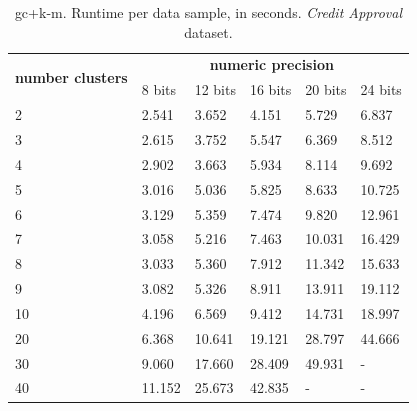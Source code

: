 \begin{table}[htp]
\centering
\caption{\acs{gc}+\acs{k-m}. Runtime per data sample, in seconds. \emph{Credit Approval} dataset.}
\label{table:runtimeKMCA}
\begin{tabular}{|l|l|l|l|l|l|}
\hline
\multirow{2}{*}{\textbf{number clusters}} & \multicolumn{5}{c|}{\textbf{numeric precision}}                                              \\ \cline{2-6}
                                          & 8 bits & 12 bits & 16 bits & 20 bits & 24 bits \\ \hline
2                                & 2.541           & 3.652            & 4.151            & 5.729            & 6.837            \\ \hline
3                                & 2.615           & 3.752            & 5.547            & 6.369            & 8.512            \\ \hline
4                                & 2.902           & 3.663            & 5.934            & 8.114            & 9.692            \\ \hline
5                                & 3.016           & 5.036            & 5.825            & 8.633            & 10.725           \\ \hline
6                                & 3.129           & 5.359            & 7.474            & 9.820            & 12.961           \\ \hline
7                                & 3.058           & 5.216            & 7.463            & 10.031           & 16.429           \\ \hline
8                                & 3.033           & 5.360            & 7.912            & 11.342           & 15.633           \\ \hline
9                                & 3.082           & 5.326            & 8.911            & 13.911           & 19.112           \\ \hline
10                               & 4.196           & 6.569            & 9.412            & 14.731           & 18.997           \\ \hline
20                               & 6.368           & 10.641           & 19.121           & 28.797           & 44.666           \\ \hline
30                               & 9.060           & 17.660           & 28.409           & 49.931           & -                \\ \hline
40                               & 11.152          & 25.673           & 42.835           & -                & -                \\ \hline

\end{tabular}
\end{table}
